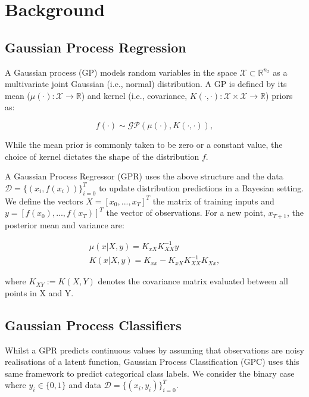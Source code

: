 \documentclass[preprint,12pt]{elsarticle}
\begin{document}
\section{Background}
\label{sec:background}

\subsection{Gaussian Process Regression}
\label{GPR}

A Gaussian process (GP) models random variables in the space $\mathcal{X}\subset \mathbb{R}^{n_{x}}$ as a multivariate joint Gaussian (i.e., normal) distribution. A GP is defined by its mean ($\mu(\cdot):\mathcal{X}\rightarrow \mathbb{R}$) and kernel (i.e., covariance, $K(\cdot,\cdot):\mathcal{X}\times\mathcal{X}\rightarrow \mathbb{R}$) priors as:

\begin{equation}
\label{gp}
f(\cdot) \sim \mathcal{GP}(\mu(\cdot), K(\cdot,\cdot)),
\end{equation}

While the mean prior is commonly taken to be zero or a constant value, the choice of kernel dictates the shape of the distribution $f$.

A Gaussian Process Regressor (GPR) uses the above structure and the data $\mathcal{D}=\{(x_{i},f(x_{i}))\}_{i=0}^{T}$ to update distribution predictions in a Bayesian setting. We define the vectors $X=[x_{0},...,x_{T}]^T$ the matrix of training inputs and $y=[f(x_{0}),...,f(x_{T})]^T$ the vector of observations. For a new point, $x_{T+1}$, the posterior mean and variance are:

\begin{eqnarray}
\label{posterior1} \mu(x|X,y)=K_{xX}K_{XX}^{-1}y \\
\label{posterior2} K(x|X,y)=K_{xx}-K_{xX}K_{XX}^{-1}K_{Xx},
\end{eqnarray}

where $K_{XY}:=K(X,Y)$ denotes the covariance matrix evaluated between all points in X and Y.

\subsection{Gaussian Process Classifiers}
\label{GPC}

Whilst a GPR predicts continuous values by assuming that observations are noisy realisations of a latent function, Gaussian Process Classification (GPC) uses this same framework to predict categorical class labels. We consider the binary case where $y_i \in \{0, 1\}$ and data $\mathcal{D} = \{(x_i, y_i)\}^T_{i=0}$.
\end{document}
